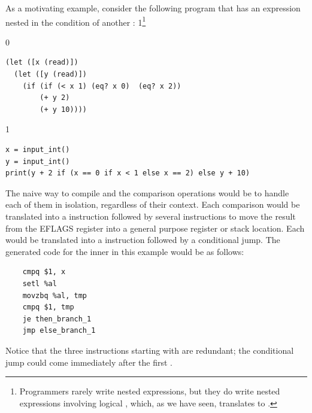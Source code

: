 \documentclass[7x10]{TimesAPriori_MIT}%
\def\racketEd{0}
\def\pythonEd{1}
\def\edition{1}
\newcommand{\pythonColor}[0]{}
\newcommand{\python}[1]{{\if\edition\pythonEd\pythonColor #1\fi}}
\numberwithin{theorem}{chapter}
\numberwithin{definition}{chapter}
\numberwithin{equation}{chapter}
\begin{document}
As a motivating example, consider the following program that has an
 expression nested in the condition of another :%
\python{\footnote{Programmers rarely write nested 
    expressions, but they do write nested expressions involving
    logical \code{and}, which, as we have seen, translates to
    \code{if}.}}
\begin{center}
\begin{minipage}{0.96\textwidth}
{\if\edition\racketEd        
\begin{lstlisting}
(let ([x (read)])
  (let ([y (read)])
    (if (if (< x 1) (eq? x 0)  (eq? x 2))
        (+ y 2)
        (+ y 10))))
\end{lstlisting}
\fi}
{\if\edition\pythonEd\pythonColor
\begin{lstlisting}
x = input_int()
y = input_int()
print(y + 2 if (x == 0 if x < 1 else x == 2) else y + 10)
\end{lstlisting}
\fi}
\end{minipage}
\end{center}
%
The naive way to compile  and the comparison operations would
be to handle each of them in isolation, regardless of their context.
Each comparison would be translated into a  instruction
followed by several instructions to move the result from the EFLAGS
register into a general purpose register or stack location. Each
 would be translated into a  instruction followed by
a conditional jump. The generated code for the inner  in this
example would be as follows:
\begin{center}
\begin{minipage}{0.96\textwidth}
\begin{lstlisting}
    cmpq $1, x
    setl %al
    movzbq %al, tmp
    cmpq $1, tmp
    je then_branch_1
    jmp else_branch_1
\end{lstlisting}
\end{minipage}
\end{center}
Notice that the three instructions starting with  are
redundant; the conditional jump could come immediately after the first
. 
\end{document}

